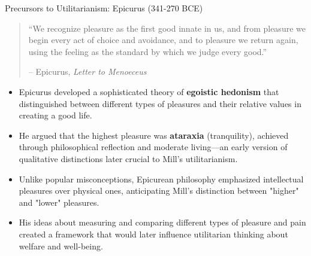 \documentclass[aspectratio=169]{beamer}
\begin{document}
\begin{frame}{Precursors to Utilitarianism: Epicurus (341-270 BCE)}
    \begin{quote}
        ``We recognize pleasure as the first good innate in us, and from pleasure we begin every act of choice and avoidance, and to pleasure we return again, using the feeling as the standard by which we judge every good.''
        \vspace{0.5em}
        
        -- Epicurus, \textit{Letter to Menoeceus}
    \end{quote}
    \begin{itemize}
        \item Epicurus developed a sophisticated theory of \textbf{egoistic hedonism} that distinguished between different types of pleasures and their relative values in creating a good life.
        
        \item He argued that the highest pleasure was \textbf{ataraxia} (tranquility), achieved through philosophical reflection and moderate living—an early version of qualitative distinctions later crucial to Mill's utilitarianism.
        
        \item Unlike popular misconceptions, Epicurean philosophy emphasized intellectual pleasures over physical ones, anticipating Mill's distinction between "higher" and "lower" pleasures.
        
        \item His ideas about measuring and comparing different types of pleasure and pain created a framework that would later influence utilitarian thinking about welfare and well-being.
    \end{itemize}
\end{frame}
\end{document}
